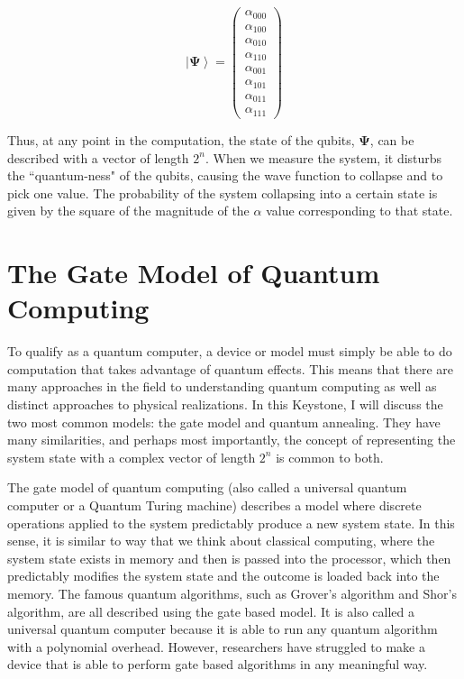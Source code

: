 \documentclass[11pt]{report}
\newcommand{\?}{\stackrel{?}{=}}
\begin{document}
$$\left | \mathbf{\Psi} \right \rangle=\begin{pmatrix}\alpha_{000}\\\alpha _{100}\\\alpha_{010}\\\alpha_{110}\\\alpha_{001}\\\alpha_{101}\\\alpha_{011}\\\alpha_{111}\end{pmatrix}$$

	Thus, at any point in the computation, the state of the qubits, $\mathbf{\Psi}$, can be described with a vector of length $2^{n}$. When we measure the system, it disturbs the ``quantum-ness" of the qubits, causing the wave function to collapse and to pick one value. The probability of the system collapsing into a certain state is given by the square of the magnitude of the $\alpha$ value corresponding to that state.

\section{The Gate Model of Quantum Computing}
To qualify as a quantum computer, a device or model must simply be able to do computation that takes advantage of quantum effects. This means that there are many approaches in the field to understanding quantum computing as well as distinct approaches to physical realizations. In this Keystone, I will discuss the two most common models: the gate model and quantum annealing. They have many similarities, and perhaps most importantly, the concept of representing the system state with a complex vector of length $2^n$ is common to both. 

The gate model of quantum computing (also called a universal quantum computer or a Quantum Turing machine) describes a model where discrete operations applied to the system predictably produce a new system state. In this sense, it is similar to way that we think about classical computing, where the system state exists in memory and then is passed into the processor, which then predictably modifies the system state and the outcome is loaded back into the memory. The famous quantum algorithms, such as Grover's algorithm and Shor's algorithm, are all described using the gate based model. It is also called a universal quantum computer because it is able to run any quantum algorithm with a polynomial overhead. However, researchers have struggled to make a device that is able to perform gate based algorithms in any meaningful way.
\end{document}
